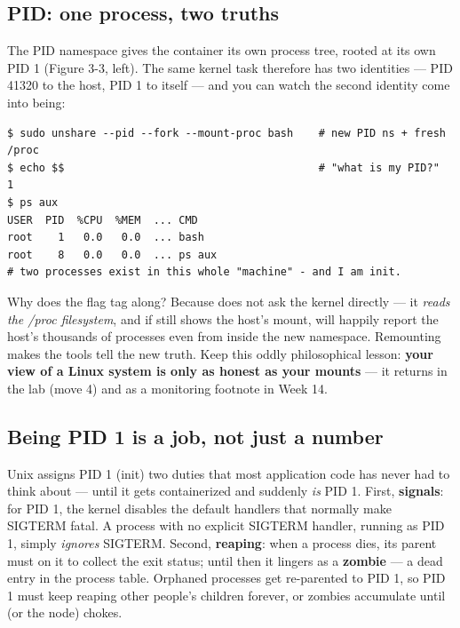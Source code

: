 \subsection*{PID: one process, two truths}

The PID namespace gives the container its own process tree, rooted at its own PID 1 (Figure 3-3, left). The same kernel task therefore has two identities — PID 41320 to the host, PID 1 to itself — and you can watch the second identity come into being:

\begin{terminalbox}
\begin{Verbatim}[breaklines=true,breakanywhere=true,fontsize=\small,formatcom=\color{tbbtermfg},codes=\tbbcodeactive]
$ sudo unshare --pid --fork --mount-proc bash    # new PID ns + fresh /proc
$ echo $$                                        # "what is my PID?"
1
$ ps aux
USER  PID  %CPU  %MEM  ... CMD
root    1   0.0   0.0  ... bash
root    8   0.0   0.0  ... ps aux
# two processes exist in this whole "machine" - and I am init.
\end{Verbatim}
\end{terminalbox}

Why does the flag  tag along? Because  does not ask the kernel directly — it \textit{reads the /proc filesystem}, and if  still shows the host's mount,  will happily report the host's thousands of processes even from inside the new namespace. Remounting  makes the tools tell the new truth. Keep this oddly philosophical lesson: \textbf{your view of a Linux system is only as honest as your mounts} — it returns in the lab (move 4) and as a monitoring footnote in Week 14.

\subsection*{Being PID 1 is a job, not just a number}

Unix assigns PID 1 (init) two duties that most application code has never had to think about — until it gets containerized and suddenly \textit{is} PID 1. First, \textbf{signals}: for PID 1, the kernel disables the default handlers that normally make SIGTERM fatal. A process with no explicit SIGTERM handler, running as PID 1, simply \textit{ignores} SIGTERM. Second, \textbf{reaping}: when a process dies, its parent must  on it to collect the exit status; until then it lingers as a \textbf{zombie} — a dead entry in the process table. Orphaned processes get re-parented to PID 1, so PID 1 must keep reaping other people's children forever, or zombies accumulate until  (or the node) chokes.

